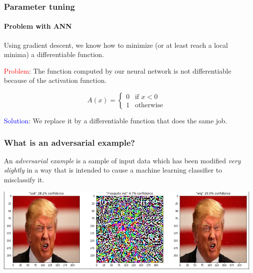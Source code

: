 \documentclass[9pt]{beamer}
\begin{document}
\begin{frame}

  \frametitle{Parameter tuning}

  \framesubtitle{Problem with ANN}

  Using gradient descent, we know how to minimize (or at least reach a
  local minima) a differentiable function.

  \pause
  \bigskip

  \textcolor{red}{Problem}: The function computed by our neural network is not
  differentiable because of the activation function.

  \[
  A(x) = \begin{cases}
    0 & \text{if } x < 0 \\
    1 & \text{otherwise}
  \end{cases}
  \]

  \medskip

  \pause

  \textcolor{blue}{Solution}: We replace it by a differentiable
  function that does the same job.

  \begin{center}
  \end{center}
\end{frame}

\begin{frame}
  \frametitle{What is an adversarial example?}

  An \emph{adversarial example} is a sample of input data which has
  been modified \emph{very slightly} in a way that is intended to
  cause a machine learning classifier to misclassify it.

  \bigskip

  \pause

  \begin{center}
    \includegraphics[trim={2pt 2pt 2pt 0}, clip, width =
      \linewidth]{images/adversarial_example_wig.png}
  \end{center}

\end{frame}
\end{document}
